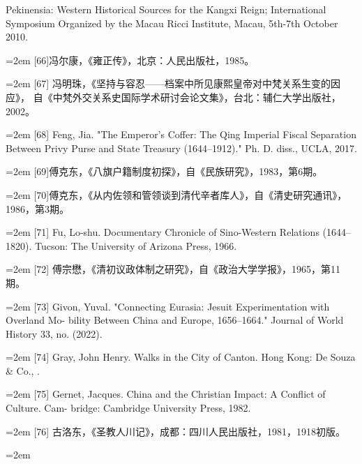\space%
Pekinensia: Western Historical Sources for the Kangxi Reign; International%
\space%
Symposium Organized by the Macau Ricci Institute, Macau, 5th-7th October 2010.%
\par
\noindent\hangindent=2em
[66]冯尔康，《雍正传》，北京：人民出版社，1985。%
\par
\noindent\hangindent=2em
[67] 冯明珠，《坚持与容忍——档案中所见康熙皇帝对中梵关系生变的因应》，%
自《中梵外交关系史国际学术研讨会论文集》，台北：辅仁大学出版社，%
2002。%
\par
\noindent\hangindent=2em
[68] Feng, Jia. "The Emperor's Coffer: The Qing Imperial Fiscal Separation Between%
\space%
Privy Purse and State Treasury (1644–1912)." Ph. D. diss., UCLA, 2017.%
\par
\noindent\hangindent=2em
[69]傅克东，《八旗户籍制度初探》，自《民族研究》，1983，第6期。%
\par
\noindent\hangindent=2em
[70]傅克东，《从内佐领和管领谈到清代辛者库人》，自《清史研究通讯》，%
1986，第3期。%
\par
\noindent\hangindent=2em
[71] Fu, Lo-shu. Documentary Chronicle of Sino-Western Relations (1644–1820).%
\space%
Tucson: The University of Arizona Press, 1966.%
\par
\noindent\hangindent=2em
[72] 傅宗懋，《清初议政体制之研究》，自《政治大学学报》，1965，第11期。%
\par
\noindent\hangindent=2em
[73] Givon, Yuval. "Connecting Eurasia: Jesuit Experimentation with Overland Mo-%
bility Between China and Europe, 1656–1664." Journal of World History 33, no.%
 (2022).%
\par
\noindent\hangindent=2em
[74] Gray, John Henry. Walks in the City of Canton. Hong Kong: De Souza \& Co.,%
.%
\par
\noindent\hangindent=2em
[75] Gernet, Jacques. China and the Christian Impact: A Conflict of Culture. Cam-%
bridge: Cambridge University Press, 1982.%
\par
\noindent\hangindent=2em
[76] 古洛东，《圣教人川记》，成都：四川人民出版社，1981，1918初版。%
\par
\noindent\hangindent=2em
